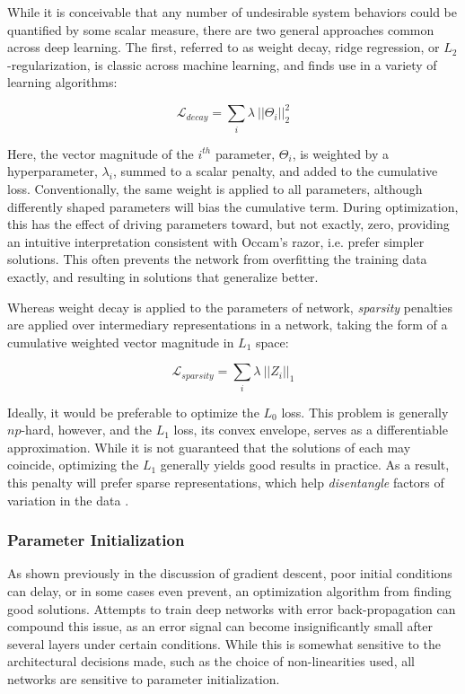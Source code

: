 While it is conceivable that any number of undesirable system behaviors could be quantified by some scalar measure, there are two general approaches common across deep learning.
The first, referred to as weight decay, ridge regression, or $L_2$-regularization, is classic across machine learning, and finds use in a variety of learning algorithms:

\begin{equation}
\mathcal{L}_{decay}=\sum_i\lambda~||\Theta_i||_2^2
\end{equation}

Here, the vector magnitude of the $i^{th}$ parameter, $\Theta_i$, is weighted by a hyperparameter, $\lambda_i$, summed to a scalar penalty, and added to the cumulative loss.
Conventionally, the same weight is applied to all parameters, although differently shaped parameters will bias the cumulative term.
During optimization, this has the effect of driving parameters toward, but not exactly, zero, providing an intuitive interpretation consistent with Occam's razor, i.e. prefer simpler solutions.
This often prevents the network from overfitting the training data exactly, and resulting in solutions that generalize better.

Whereas weight decay is applied to the parameters of network, \emph{sparsity} penalties are applied over intermediary representations in a network, taking the form of a cumulative weighted vector magnitude in $L_1$ space:

\begin{equation}
\mathcal{L}_{sparsity}=\sum_i\lambda~||Z_i||_1
\end{equation}

\noindent Ideally, it would be preferable to optimize the $L_0$ loss.
This problem is generally $np$-hard, however, and the $L_1$ loss, its convex envelope, serves as a differentiable approximation.
While it is not guaranteed that the solutions of each may coincide, optimizing the $L_1$ generally yields good results in practice.
As a result, this penalty will prefer sparse representations, which help \emph{disentangle} factors of variation in the data \cite{Bengio2009Learning}.


\subsubsection{Parameter Initialization}

As shown previously in the discussion of gradient descent, poor initial conditions can delay, or in some cases even prevent, an optimization algorithm from finding good solutions.
Attempts to train deep networks with error back-propagation can compound this issue, as an error signal can become insignificantly small after several layers under certain conditions.
While this is somewhat sensitive to the architectural decisions made, such as the choice of non-linearities used, all networks are sensitive to parameter initialization.


